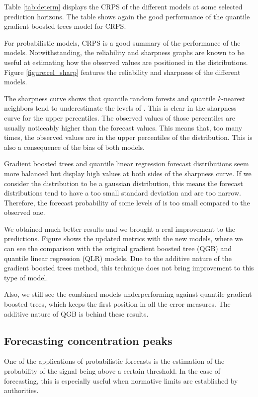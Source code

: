 \documentclass[a4paper,3p,sort&compress]{elsarticle}
\begin{document}
Table \ref{tab:determ} displays the CRPS of the different models at
some selected prediction horizons. The table shows again the good
performance of the quantile 
gradient boosted trees model for CRPS.

For probabilistic models, CRPS is a good summary of the performance of
the models. Notwithstanding, the reliability and sharpness graphs are
known to be useful at estimating how the observed values are
positioned in the distributions.  Figure \ref{figure:rel_sharp}
features the reliability and sharpness of the different models.

The sharpness curve shows that quantile random forests 
and quantile $k$-nearest
neighbors tend to underestimate the levels of
\no. This is clear in the sharpness curve for the
upper percentiles. The observed values of those percentiles are
usually noticeably higher than the forecast values. This means that,
too many times, the observed values are in the upper percentiles of
the distribution. This is also a consequence of the bias of both
models.

Gradient boosted trees and quantile linear regression forecast
distributions seem more balanced but display high values at both sides
of the sharpness curve.  If we consider the distribution to be a
gaussian distribution, this means the forecast distributions tend to
have a too small standard deviation and are too narrow. Therefore, the
forecast probability of some levels of \no is too
small compared to the observed one.

We obtained much better results and we brought a real improvement to
the predictions. Figure  shows the updated
metrics with the new models, where we can see the comparison with the
original gradient boosted tree (QGB) and quantile linear regression
(QLR) models. Due to the additive nature of the gradient boosted trees
method, this technique does not bring improvement to this type of
model.

Also, we still see the combined models underperforming against
quantile gradient boosted trees, which keeps the first position in all
the error measures. The additive nature of QGB is behind these
results.

\subsection{Forecasting \no concentration peaks}

One of the applications of probabilistic forecasts is the estimation
of the probability of the signal being above a certain threshold. In
the case of \no forecasting, this is especially useful when normative
limits are established by authorities.
\end{document}
